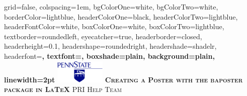 \documentclass[landscape,final,a0paper,fontscale=0.285]{baposter}
\begin{document}



\begin{poster}%
  {
  grid=false,
  colspacing=1em,
  bgColorOne=white,
  bgColorTwo=white,
  borderColor=lightblue,
  headerColorOne=black,
  headerColorTwo=lightblue,
  headerFontColor=white,
  boxColorOne=white,
  boxColorTwo=lightblue,
  textborder=roundedleft,
  eyecatcher=true,
  headerborder=closed,
  headerheight=0.1\textheight,
  headershape=roundedright,
  headershade=shadelr,
  headerfont=\Large\bf\textsc, %
  textfont={\setlength{\parindent}{1.5em}},
  boxshade=plain,
  background=plain,
  linewidth=2pt
  }
  {\includegraphics[height=3em]{images/psulogo.png}} 
  {\bf\textsc{Creating a Poster with the baposter package in \LaTeX{} } \vspace{0.5em}}
  {\textsc{PRI Help Team}}
  {%
  }

    \newcommand{\colouredcircle}{%
      \tikz{\useasboundingbox (-0.2em,-0.32em) rectangle(0.2em,0.32em); \draw[draw=black,fill=lightblue,line width=0.03em] (0,0) circle(0.18em);}}


\end{poster}
\end{document}
